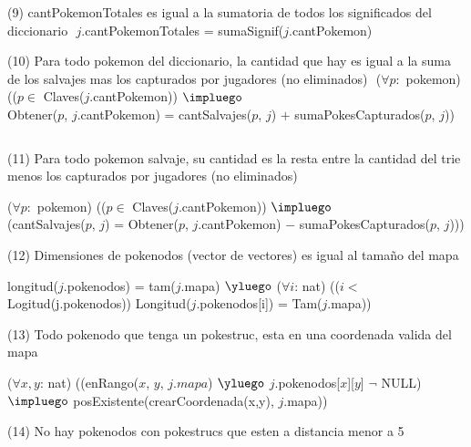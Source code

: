 \begin{Representacion}
(9) cantPokemonTotales es igual a la sumatoria de todos los significados del diccionario $ $\newline
$j$.cantPokemonTotales = sumaSignif($j$.cantPokemon)
$ $\newline

(10) Para todo pokemon del diccionario, la cantidad que hay es igual a la suma de los salvajes mas los capturados por jugadores (no eliminados) $ $\newline
($\forall p: $ pokemon) (($p \in$ Claves($j$.cantPokemon)) $\impluego$ \\
  Obtener($p$, $j$.cantPokemon) = cantSalvajes($p$, $j$) $+$ sumaPokesCapturados($p$, $j$))

$ $\newline

(11) Para todo pokemon salvaje, su cantidad es la resta entre la cantidad del trie menos los capturados por jugadores (no eliminados) $ $\newline

($\forall p: $ pokemon) (($p \in$ Claves($j$.cantPokemon)) $\impluego$ \\ 
  (cantSalvajes($p$, $j$) = Obtener($p$, $j$.cantPokemon) $-$ sumaPokesCapturados($p$, $j$)))
$ $\newline


(12) Dimensiones de pokenodos (vector de vectores) es igual al tama\~no del mapa $ $\newline

longitud($j$.pokenodos) = tam($j$.mapa) $\yluego$ 
($\forall i$: nat) (($i <$ Logitud(j.pokenodos)) Longitud($j$.pokenodos[i]) = Tam($j$.mapa)) 
$ $\newline

(13) Todo pokenodo que tenga un pokestruc, esta en una coordenada valida del mapa $ $\newline

($\forall x, y$: nat) ((enRango($x$, $y$, $j.mapa$) $\yluego$ $j$.pokenodos[$x$][$y$] $\neg$ NULL) \\
  $\impluego$ posExistente(crearCoordenada(x,y), $j$.mapa))
$ $\newline


(14) No hay pokenodos con pokestrucs que esten a distancia menor a 5 $ $\newline


\end{Representacion}

